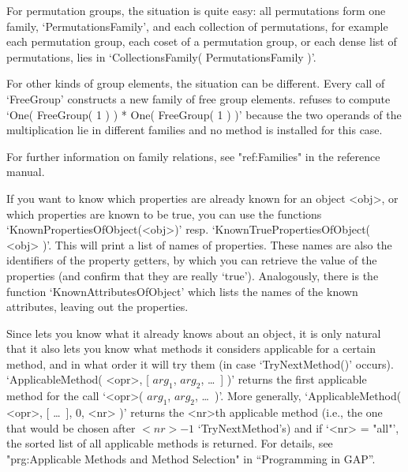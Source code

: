 For permutation groups, the situation is quite easy:
all permutations form  one family, `PermutationsFamily',
and each collection of permutations,
for example each permutation group, each coset of a permutation group,
or each dense list of permutations,
lies in `CollectionsFamily( PermutationsFamily )'.

For other kinds of group elements, the situation can be different.
Every call of `FreeGroup' constructs a new family of free group elements.
{\GAP} refuses to compute `One( FreeGroup( 1 ) ) * One( FreeGroup( 1 ) )'
because the two operands of the multiplication lie in different families
and no method is installed for this case.

For further information on family relations,
see "ref:Families" in the reference manual.

%
%
If you want to know  which properties are already known for an object
<obj>, or which properties are known to be true, you can use the
functions `KnownPropertiesOfObject(<obj>)' resp.
`KnownTruePropertiesOfObject( <obj> )'. This will print a list of names
of properties. These names are also the identifiers of the property
getters, by which you can retrieve the value of the properties (and
confirm that they are really `true'). Analogously, there is the function
`KnownAttributesOfObject' which lists the names of the known attributes,
leaving out the properties.

%
Since {\GAP} lets you know what it already  knows about an object, it is
only natural  that   it also  lets   you know what  methods  it considers
applicable for a certain method, and in  what order it  will try them (in
case `TryNextMethod()'  occurs).   `ApplicableMethod( <opr>, [   $arg_1$,
$arg_2$, \dots\ ]  )' returns the  first  applicable method for the  call
`<opr>( $arg_1$, $arg_2$,  \dots\ )'. More  generally, `ApplicableMethod(
<opr>, [ \dots\ ], 0, <nr> )' returns the <nr>th applicable method (i.e.,
the one  that would be  chosen  after  $<nr>-1$ `TryNextMethod's) and  if
`<nr>  = "all"', the sorted list  of  all applicable methods is returned.
For  details,  see "prg:Applicable Methods  and  Method Selection" in
``Programming in GAP''.

